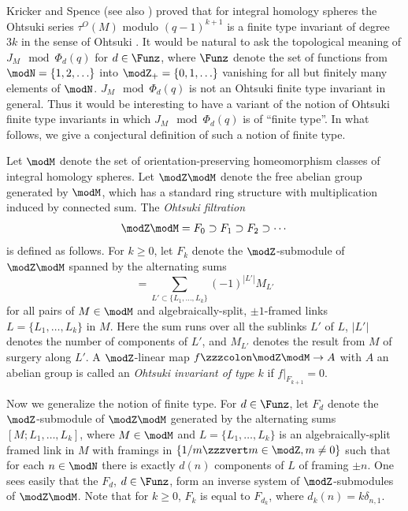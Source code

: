 \documentclass{amsart}
\numberwithin{equation}{section}
\numberwithin{figure}{section}
\theoremstyle{plain}
\theoremstyle{definition}
\theoremstyle{remark}
\begin{document}
Kricker and Spence \cite{Kricker-Spence} (see also \cite{Ohtsuki4})
proved that for integral homology spheres the Ohtsuki series $\tau ^O(M)$
modulo $(q-1)^{k+1}$ is a finite type invariant of degree $3k$ in the
sense of Ohtsuki \cite{Ohtsuki6}.  It would be natural to ask the
topological meaning of $J_M\mod \Phi _d(q)$ for $d\in \Funz$, where $\Funz$
denote the set of functions from $\modN =\{1,2,\ldots\}$ into
$\modZ _+=\{0,1,\ldots\}$ vanishing for all but finitely many elements of
$\modN $.  $J_M\mod \Phi _d(q)$ is not an Ohtsuki finite type invariant in
general.  Thus it would be interesting to have a variant of the notion
of Ohtsuki finite type invariants in which $J_M\mod \Phi _d(q)$ is of
``finite type''.  In what follows, we give a conjectural definition of
such a notion of finite type.

Let $\modM $ denote the set of orientation-preserving homeomorphism
classes of integral homology spheres.  Let $\modZ \modM $ denote the free
abelian group generated by $\modM $, which has a standard ring structure
with multiplication induced by connected sum.  The {\em Ohtsuki
filtration}
\begin{equation*}
  \modZ \modM =F_0\supset F_1\supset F_2\supset \cdots
\end{equation*}
is defined as follows.  For $k\ge 0$, let $F_k$ denote the
$\modZ $-submodule of $\modZ \modM $ spanned by the alternating sums
\begin{equation*}
  [M;L_1,\ldots,L_k]=\sum_{L'\subset \{L_1,\ldots,L_k\}}(-1)^{|L'|}M_{L'}
\end{equation*}
for all pairs of $M\in \modM $ and algebraically-split, $\pm 1$-framed links
$L=\{L_1,\ldots,L_k\}$ in $M$.  Here the sum runs over all the sublinks $L'$
of $L$, $|L'|$ denotes the number of components of $L'$, and $M_{L'}$
denotes the result from $M$ of surgery along $L'$.  A $\modZ $-linear map
$f\zzzcolon \modZ \modM \rightarrow A$ with $A$ an abelian group is called an {\em Ohtsuki
invariant of type $k$} if $f|_{F_{k+1}}=0$.

Now we generalize the notion of finite type.  For $d\in \Funz$, let $F_d$
denote the $\modZ $-submodule of $\modZ \modM $ generated by the alternating sums
$[M;L_1,\ldots,L_k]$, where $M\in \modM $ and $L=\{L_1,\ldots,L_k\}$ is an
algebraically-split framed link in $M$ with framings in
$\{1/m\zzzvert m\in \modZ ,m\neq0\}$ such that for each $n\in \modN $ there is exactly
$d(n)$ components of $L$ of framing $\pm n$.  One sees easily that the
$F_d$, $d\in \Funz$, form an inverse system of $\modZ $-submodules of $\modZ \modM $.
Note that for $k\ge 0$, $F_k$ is equal to $F_{d_k}$, where
$d_k(n)=k\delta _{n,1}$.
\end{document}
